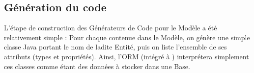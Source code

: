\subsection{Génération du code \kwentity{}}

L'étape de construction des Générateurs de Code pour le Modèle \kwentity{} a été relativement simple : Pour chaque \kwentity{} contenue dans le Modèle, on génère une simple classe Java portant le nom de ladite Entité, puis on liste l'ensemble de ses attributs (types et propriétés). Ainsi, l'ORM \kwebean{} (intégré à \kwplay{}) interprétera simplement ces classes comme étant des données à stocker dans une Base.





